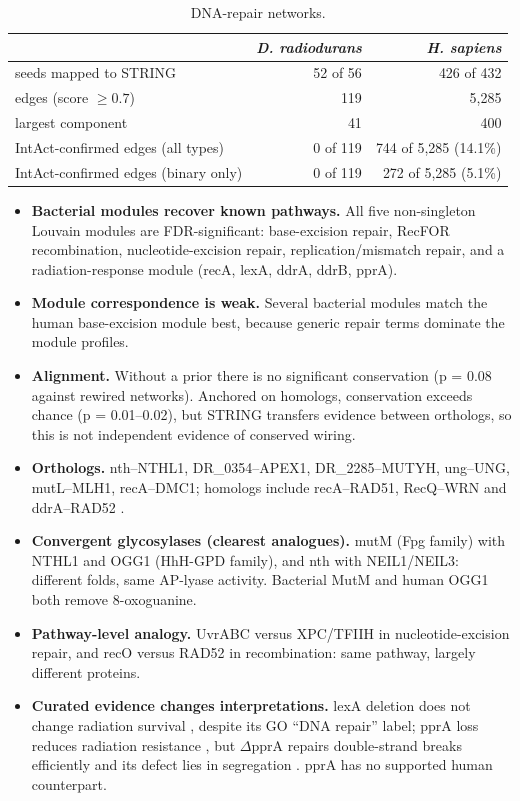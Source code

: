 \begin{table}[htbp]
\centering
\small
\begin{tabular}{lrr}
\toprule
 & \emph{D. radiodurans} & \emph{H. sapiens} \\
\midrule
seeds mapped to STRING & 52 of 56 & 426 of 432 \\
edges (score $\geq 0.7$) & 119 & 5,285 \\
largest component & 41 & 400 \\
IntAct-confirmed edges (all types) & 0 of 119 & 744 of 5,285 (14.1\%) \\
IntAct-confirmed edges (binary only) & 0 of 119 & 272 of 5,285 (5.1\%) \\
\bottomrule
\end{tabular}
\caption{DNA-repair networks.}
\end{table}

\begin{itemize}
  \item \textbf{Bacterial modules recover known pathways.} All five non-singleton Louvain
    modules are FDR-significant: base-excision repair, RecFOR recombination,
    nucleotide-excision repair, replication/mismatch repair, and a radiation-response module
    (recA, lexA, ddrA, ddrB, pprA).
  \item \textbf{Module correspondence is weak.} Several bacterial modules match the human
    base-excision module best, because generic repair terms dominate the module profiles.
  \item \textbf{Alignment.} Without a prior there is no significant conservation (p = 0.08 against
    rewired networks). Anchored on homologs, conservation exceeds chance (p = 0.01--0.02), but STRING
    transfers evidence between orthologs, so this is not independent evidence of conserved
    wiring.
  \item \textbf{Orthologs.} nth--NTHL1, DR\_0354--APEX1, DR\_2285--MUTYH, ung--UNG,
    mutL--MLH1, recA--DMC1; homologs include recA--RAD51, RecQ--WRN and ddrA--RAD52
    \cite{harris2004}.
  \item \textbf{Convergent glycosylases (clearest analogues).} mutM (Fpg family) with NTHL1 and
    OGG1 (HhH-GPD family), and nth with NEIL1/NEIL3: different folds, same AP-lyase activity.
    Bacterial MutM and human OGG1 both remove 8-oxoguanine.
  \item \textbf{Pathway-level analogy.} UvrABC versus XPC/TFIIH in nucleotide-excision repair,
    and recO versus RAD52 in recombination: same pathway, largely different proteins.
  \item \textbf{Curated evidence changes interpretations.} lexA deletion does not change
    radiation survival \cite{jolivet2006}, despite its GO ``DNA repair'' label; pprA loss
    reduces radiation resistance \cite{narumi2004}, but $\Delta$pprA repairs double-strand
    breaks efficiently and its defect lies in segregation \cite{devigne2013}. pprA has no
    supported human counterpart.
\end{itemize}

